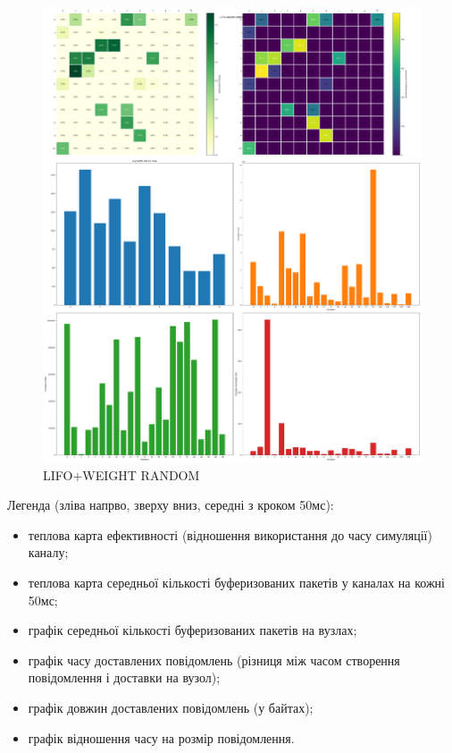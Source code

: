 \documentclass[11pt,a4paper]{article}
\begin{document}
\begin{figure}[H]
\includegraphics[width=\textwidth]{lifo_weight_random.png}
\caption{LIFO+WEIGHT RANDOM}
\end{figure}

Легенда (зліва напрво, зверху вниз, середні з кроком 50мс):
\begin{itemize}
\item теплова карта ефективності (відношення використання до часу симуляції) каналу;
\item теплова карта середньої кількості буферизованих пакетів у каналах на кожні 50мс;
\item графік середньої кількості буферизованих пакетів на вузлах;
\item графік часу доставлених повідомлень (різниця між часом створення повідомлення і
доставки на вузол);
\item графік довжин доставлених повідомлень (у байтах);
\item графік відношення часу на розмір повідомлення.
\end{itemize}
\end{document}
